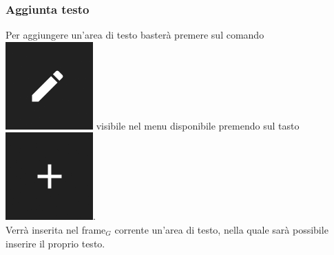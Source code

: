 \subsubsection{Aggiunta testo}
Per aggiungere un'area di testo basterà premere sul comando \includegraphics[scale=0.4]{img/add_text.png} visibile nel menu disponibile premendo sul tasto \includegraphics[scale=0.4]{img/add_object.png}. \\
Verrà inserita nel frame$_G$ corrente un'area di testo, nella quale sarà possibile inserire il proprio testo.


